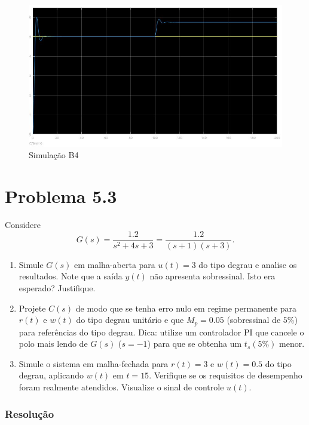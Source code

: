\documentclass[
]{book}
\providecommand{\tightlist}{%
  \setlength{\itemsep}{0pt}\setlength{\parskip}{0pt}}
\theoremstyle{definition}
\theoremstyle{definition}
\theoremstyle{definition}
\theoremstyle{remark}
\begin{document}
\begin{figure}

{\centering \includegraphics[width=0.8\linewidth]{Imagens/Lab5/Resolução/prob2D1} 

}

\caption{Simulação B4}\label{fig:prob2D1}
\end{figure}

\hypertarget{problema-5.3}{%
\section*{Problema 5.3}\label{problema-5.3}}

Considere
\[
G(s) = \frac{1.2}{s^2+4s+3} = \frac{1.2}{(s+1)(s+3)}.
\]

\begin{enumerate}
\def\labelenumi{(\alph{enumi})}
\tightlist
\item
  Simule \(G(s)\) em malha-aberta para \(u(t) =3\) do tipo degrau e analise os resultados. Note que a saída \(y(t)\) não apresenta sobressinal. Isto era esperado? Justifique.
\item
  Projete \(C(s)\) de modo que se tenha erro nulo em regime permanente para \(r(t)\) e \(w(t)\) do tipo degrau unitário e que \(M_p=0.05\) (sobressinal de \(5\%\)) para referências do tipo degrau. Dica: utilize um controlador PI que cancele o polo mais lendo de \(G(s)\) (\(s=-1\)) para que se obtenha um \(t_s(5\%)\) menor.
\item
  Simule o sistema em malha-fechada para \(r(t) = 3\) e \(w(t) = 0.5\) do tipo degrau, aplicando \(w(t)\) em \(t=15\). Verifique se os requisitos de desempenho foram realmente atendidos. Visualize o sinal de controle \(u(t)\).
\end{enumerate}

\hypertarget{resoluuxe7uxe3o-14}{%
\subsubsection*{Resolução}\label{resoluuxe7uxe3o-14}}
\end{document}

